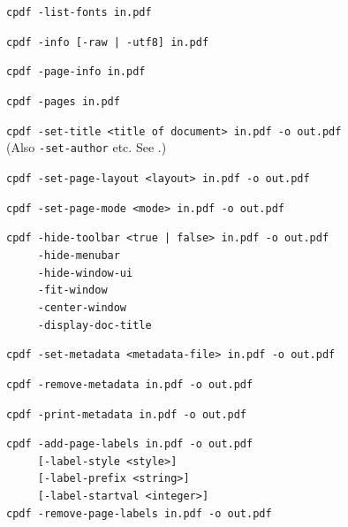 \documentclass[a4paper,makeidx]{memoir}
\begin{document}
  \begin{framed}
    \small\noindent\verb!cpdf -list-fonts in.pdf!

    \vspace{1.5mm}
    \small\noindent\verb!cpdf -info [-raw | -utf8] in.pdf!

    \vspace{1.5mm}
    \small\noindent\verb!cpdf -page-info in.pdf!

    \vspace{1.5mm}
    \small\noindent\verb!cpdf -pages in.pdf!

    \vspace{1.5mm}
    \small\noindent\verb!cpdf -set-title <title of document> in.pdf -o out.pdf!\\
    (Also \texttt{-set-author} etc. See .)

    \vspace{1.5mm}
    \small\noindent\verb!cpdf -set-page-layout <layout> in.pdf -o out.pdf!

    \vspace{1.5mm}
    \small\noindent\verb!cpdf -set-page-mode <mode> in.pdf -o out.pdf!

    \vspace{1.5mm} 
    \small\noindent\verb!cpdf -hide-toolbar <true | false> in.pdf -o out.pdf!\\
    \noindent\verb!     -hide-menubar!\\
    \noindent\verb!     -hide-window-ui!\\
    \noindent\verb!     -fit-window!\\
    \noindent\verb!     -center-window!\\
    \noindent\verb!     -display-doc-title!

    \vspace{1.5mm}
    \small\noindent\verb!cpdf -set-metadata <metadata-file> in.pdf -o out.pdf!

    \vspace{1.5mm}
    \small\noindent\verb!cpdf -remove-metadata in.pdf -o out.pdf!

    \vspace{1.5mm}
    \small\noindent\verb!cpdf -print-metadata in.pdf -o out.pdf!
    
    \vspace{1.5mm}
    \small\noindent\verb!cpdf -add-page-labels in.pdf -o out.pdf!\\
    \noindent\verb!     [-label-style <style>]!\\
    \noindent\verb!     [-label-prefix <string>]!\\
    \noindent\verb!     [-label-startval <integer>]!\\
    
    \vspace{1.5mm}
    \small\noindent\verb!cpdf -remove-page-labels in.pdf -o out.pdf!
  \end{framed}
\end{document}
